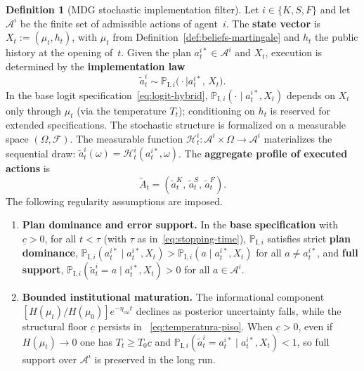 \documentclass[ecta,nameyear,final,supplement]{econsocart}
\numberwithin{equation}{section}
\numberwithin{table}{section}
\theoremstyle{definition}
\newtheorem{definition}[theorem]{Definition}
\newcommand{\ProbI}[1]{\mathbb{P}_{\mathrm{I},#1}}
\begin{document}

\begin{definition}[MDG stochastic implementation filter]
\label{def:mano-dios-filtro}
Let $i\in\{K,S,F\}$ and let $\mathcal{A}^i$ be the finite set of admissible
actions of agent~$i$. The \textbf{state vector} is
$X_t:=(\mu_t,h_t)$, with $\mu_t$ from
Definition~\ref{def:beliefs-martingale} and $h_t$ the public history at the
opening of~$t$. Given the plan $a_t^{i\ast}\in\mathcal{A}^i$ and $X_t$,
execution is determined by the \textbf{implementation law}
\[
\tilde{a}_t^i \sim \ProbI{i}\bigl(\cdot \mid a_t^{i\ast},\,X_t\bigr).
\]
In the base logit specification~\eqref{eq:logit-hybrid},
$\ProbI{i}(\cdot\mid a_t^{i\ast},X_t)$ depends on $X_t$ only through $\mu_t$
(via the temperature $T_t$); conditioning on $h_t$ is reserved for extended
specifications. The stochastic structure is formalized on a measurable space
$(\Omega,\mathcal{F})$. The measurable function
$\mathcal{H}_t^i:\mathcal{A}^i\times\Omega\to\mathcal{A}^i$ materializes the
sequential draw: $\tilde{a}_t^i(\omega)=\mathcal{H}_t^i(a_t^{i\ast},\omega)$.
The \textbf{aggregate profile of executed actions} is
\begin{equation}
\label{eq:tilde-A-t}
\tilde{A}_t = (\tilde{a}_t^K,\,\tilde{a}_t^S,\,\tilde{a}_t^F).
\end{equation}
The following regularity assumptions are imposed.
\begin{enumerate}
  \item[\textup{(i)}] \textbf{Plan dominance and error support.}
  In the \textbf{base specification} with $\underline{c}>0$, for all
  $t<\tau$ (with $\tau$ as in~\eqref{eq:stopping-time}),
  $\ProbI{i}$ satisfies strict \textbf{plan dominance},
  $\ProbI{i}(a_t^{i\ast}\mid a_t^{i\ast},X_t)>\ProbI{i}(a\mid a_t^{i\ast},X_t)$
  for all $a\neq a_t^{i\ast}$, and \textbf{full support},
  $\ProbI{i}(\tilde{a}_t^i=a\mid a_t^{i\ast},X_t)>0$ for all
  $a\in\mathcal{A}^i$.
  \item[\textup{(ii)}] \textbf{Bounded institutional maturation.}
  The informational component
  $[H(\mu_t)/H(\mu_0)]e^{-\eta_{\mathrm{cal}}t}$ declines as posterior
  uncertainty falls, while the structural floor $\underline{c}$ persists in
  ~\eqref{eq:temperatura-piso}. When $\underline{c}>0$, even if
  $H(\mu_t)\to 0$ one has $T_t\ge T_0\underline{c}$ and
  $\ProbI{i}(\tilde{a}_t^i=a_t^{i\ast}\mid a_t^{i\ast},X_t)<1$, so full
  support over $\mathcal{A}^i$ is preserved in the long run.
\end{enumerate}

\end{definition}
\end{document}
